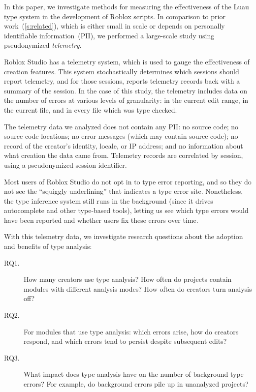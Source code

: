 \documentclass[english,submission,cleveref]{programming}
\begin{document}
In this paper, we investigate methods for measuring the effectiveness
of the {Luau} type system in the development of {Roblox} scripts.
In comparison to prior work~(\cref{s:related}), which is either small in scale
or depends on personally identifiable information~(PII),
we performed a large-scale study using pseudonymized \emph{telemetry}.

{Roblox Studio} has a telemetry system, which is used to gauge
the effectiveness of creation features. This system stochastically
determines which sessions should report telemetry, and for those
sessions, reports telemetry records back with a summary of the
session. In the case of this study, the telemetry includes data on the
number of errors at various levels of granularity: in the current edit
range, in the current file, and in every file which was type
checked.

The telemetry data we analyzed does not contain any PII:
no source code;
no source code locations;
no error messages (which may contain source code);
no record of the creator's identity, locale, or IP address;
and no information about what creation the data came from.
Telemetry records are correlated by session, using a pseudonymized
session identifier.

Most users of {Roblox Studio} do not opt in to type error
reporting, and so they do not see the ``squiggly underlining'' that
indicates a type error site. Nonetheless, the type inference system
still runs in the background (since it drives autocomplete and other
type-based tools), letting us see which type errors would have
been reported and whether users fix these errors over time.

With this telemetry data, we investigate research questions about
the adoption and benefits of type analysis:
\begin{description}
  \item[RQ1.]
    How many creators use type analysis?
    How often do projects contain modules with different
    analysis modes?
    How often do creators turn analysis off?
  \item[RQ2.]
    For modules that use type analysis:
    which errors arise,
    how do creators respond,
    and which errors tend to persist despite subsequent edits?
  \item[RQ3.]
    What impact does type analysis have on the number of background type
    errors?
    For example, do background errors pile up in unanalyzed projects?
\end{description}
\end{document}

